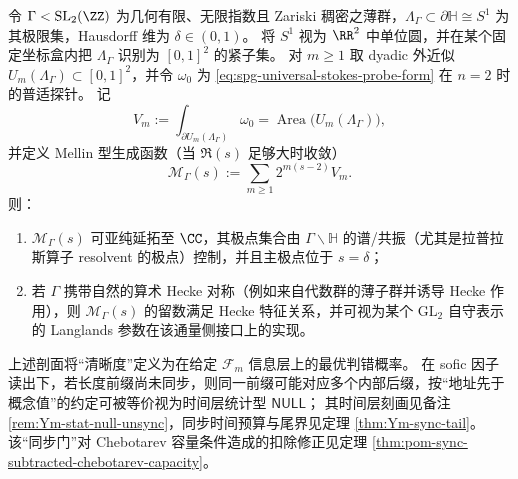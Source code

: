






\begin{conjecture}\label{conj:spg-stokes-flux-current-automorphic-spectral-modularity}
令 \(\Gamma<\mathrm{SL}_2(\ZZ)\) 为几何有限、无限指数且 Zariski 稠密之薄群，\(\Lambda_\Gamma\subset \partial\mathbb{H}\cong S^1\) 为其极限集，Hausdorff 维为 \(\delta\in(0,1)\)。
将 \(S^1\) 视为 \(\RR^2\) 中单位圆，并在某个固定坐标盒内把 \(\Lambda_\Gamma\) 识别为 \([0,1]^2\) 的紧子集。
对 \(m\ge 1\) 取 dyadic 外近似 \(U_m(\Lambda_\Gamma)\subset[0,1]^2\)，并令 \(\omega_0\) 为 \eqref{eq:spg-universal-stokes-probe-form} 在 \(n=2\) 时的普适探针。
记
\[
V_m:=\int_{\partial U_m(\Lambda_\Gamma)}\omega_0=\operatorname{Area}\bigl(U_m(\Lambda_\Gamma)\bigr),
\]
并定义 Mellin 型生成函数（当 \(\Re(s)\) 足够大时收敛）
\[
\mathcal{M}_\Gamma(s):=\sum_{m\ge 1}2^{m(s-2)}V_m.
\]
则：
\begin{enumerate}
  \item \(\mathcal{M}_\Gamma(s)\) 可亚纯延拓至 \(\CC\)，其极点集合由 \(\Gamma\backslash\mathbb{H}\) 的谱/共振（尤其是拉普拉斯算子 resolvent 的极点）控制，并且主极点位于 \(s=\delta\)；
  \item 若 \(\Gamma\) 携带自然的算术 Hecke 对称（例如来自代数群的薄子群并诱导 Hecke 作用），则 \(\mathcal{M}_\Gamma(s)\) 的留数满足 Hecke 特征关系，并可视为某个 \(\mathrm{GL}_2\) 自守表示的 Langlands 参数在该通量侧接口上的实现。
\end{enumerate}
\end{conjecture}

\begin{remark}[与同步门与空值语义的接口]\label{rem:spg-sync-null-interface}
上述剖面将“清晰度”定义为在给定 $\mathcal{F}_m$ 信息层上的最优判错概率。
在 sofic 因子读出下，若长度前缀尚未同步，则同一前缀可能对应多个内部后缀，按“地址先于概念值”的约定可被等价视为时间层统计型 $\mathsf{NULL}$；
其时间层刻画见备注 \ref{rem:Ym-stat-null-unsync}，同步时间预算与尾界见定理 \ref{thm:Ym-sync-tail}。
该“同步门”对 Chebotarev 容量条件造成的扣除修正见定理 \ref{thm:pom-sync-subtracted-chebotarev-capacity}。
\end{remark}

